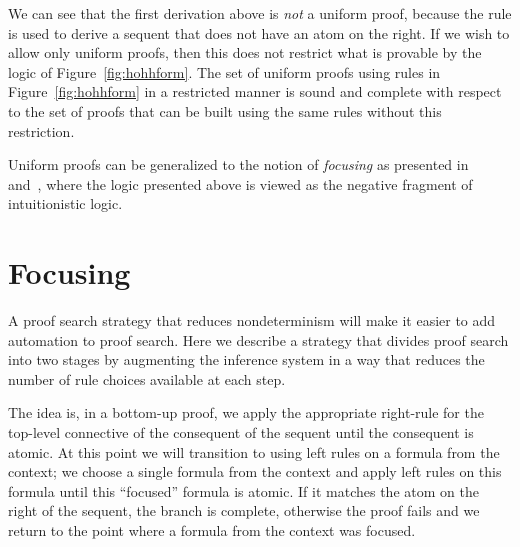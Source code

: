 We can see that the first derivation above is \emph{not} a uniform proof, because the rule  is used to derive a sequent that does not have an atom on the right. If we wish to allow only uniform proofs, then this does not restrict what is provable by the logic of Figure~\ref{fig:hohhform}. The set of uniform proofs using rules in Figure~\ref{fig:hohhform} in a restricted manner is sound and complete with respect to the set of proofs that can be built using the same rules without this restriction.

Uniform proofs can be generalized to the notion of \emph{focusing} as presented in~\cite{LM:TCS09} and~\cite{Chaudhuri:LNCS08}, where the logic presented above is viewed as the negative fragment of intuitionistic logic.

\section{Focusing}
\label{sec:focusing}

A proof search strategy that reduces nondeterminism will make it easier to add automation to proof search. Here we describe a strategy that divides proof search into two stages by augmenting the inference system in a way that reduces the number of rule choices available at each step.

The idea is, in a bottom-up proof, we apply the appropriate right-rule for the top-level connective of the consequent of the sequent until the consequent is atomic. At this point we will transition to using left rules on a formula from the context; we choose a single formula from the context and apply left rules on this formula until this ``focused'' formula is atomic. If it matches the atom on the right of the sequent, the branch is complete, otherwise the proof fails and we return to the point where a formula from the context was focused.

